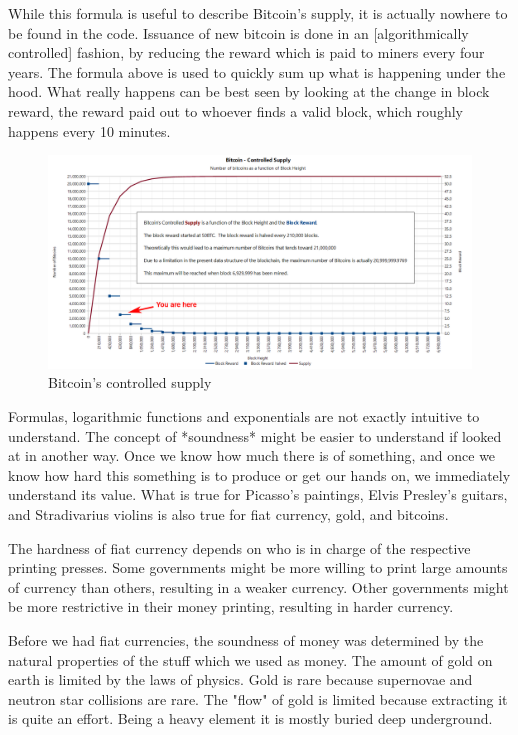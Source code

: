 While this formula is useful to describe Bitcoin's supply, it is
actually nowhere to be found in the code. Issuance of new bitcoin is
done in an [algorithmically controlled] fashion, by reducing the reward
which is paid to miners every four years. The formula above is used to
quickly sum up what is happening under the hood. What really happens can
be best seen by looking at the change in block reward, the reward paid
out to whoever finds a valid block, which roughly happens every 10
minutes.


\begin{figure}
  \includegraphics{assets/images/you-are-here.png}
  \caption{Bitcoin's controlled supply}
  \label{fig:you-are-here.png}
\end{figure}

Formulas, logarithmic functions and exponentials are not exactly
intuitive to understand. The concept of *soundness* might be easier to
understand if looked at in another way. Once we know how much there is
of something, and once we know how hard this something is to produce or
get our hands on, we immediately understand its value. What is true for
Picasso's paintings, Elvis Presley's guitars, and Stradivarius violins
is also true for fiat currency, gold, and bitcoins.

The hardness of fiat currency depends on who is in charge of the
respective printing presses. Some governments might be more willing to
print large amounts of currency than others, resulting in a weaker
currency. Other governments might be more restrictive in their money
printing, resulting in harder currency.

Before we had fiat currencies, the soundness of money was determined by
the natural properties of the stuff which we used as money. The amount
of gold on earth is limited by the laws of physics. Gold is rare because
supernovae and neutron star collisions are rare. The "flow" of gold is
limited because extracting it is quite an effort. Being a heavy element
it is mostly buried deep underground.

